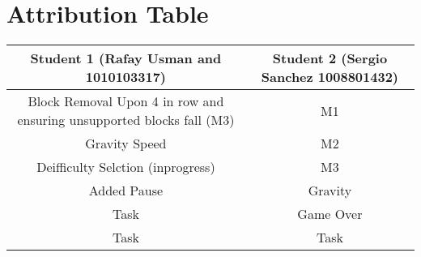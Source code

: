 \documentclass{article}
\begin{document}
\section{Attribution Table}
\begin{center}
\begin{tabular}{|| c | c ||}
\hline
 Student 1 (Rafay Usman and 1010103317) &  Student 2 (Sergio Sanchez 1008801432) \\ 
 \hline
 Block Removal Upon 4 in row and ensuring unsupported blocks fall (M3)& M1 \\
 \hline
 Gravity Speed & M2 \\
 \hline
 Deifficulty Selction (inprogress) & M3 \\ 
 \hline
 Added Pause & Gravity \\ 
 \hline
 Task & Game Over\\
 \hline
 Task & Task\\  
 \hline
\end{tabular}
\end{center}

\end{document}
